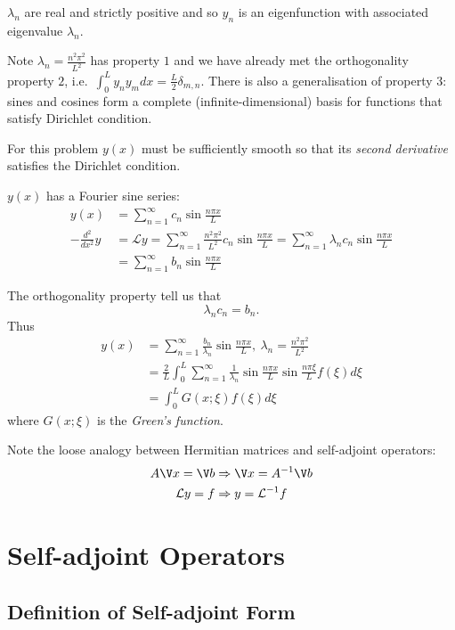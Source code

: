 \documentclass[a4paper]{article}
\renewcommand*{\L}{\mathcal{L}}
\begin{document}
\begin{note}
  \(\lambda_n\) are real and strictly positive and so \(y_n\) is an eigenfunction with associated eigenvalue \(\lambda_n\).
\end{note}

Note \(\lambda_n = \frac{n^2\pi^2}{L^2}\) has property \(1\) and we have already met the orthogonality property \(2\), i.e.\ \(\int_{0}^{L} y_ny_m dx=\frac{L}{2}\delta_{m,n} \). There is also a generalisation of property \(3\): sines and cosines form a complete (infinite-dimensional) basis for functions that satisfy Dirichlet condition.

For this problem \(y(x)\) must be sufficiently smooth so that its \emph{second derivative} satisfies the Dirichlet condition.

\(y(x)\) has a Fourier sine series:
\begin{align*}
  y(x) &= \sum_{n=1}^{\infty}c_n \sin \frac{n\pi x}{L} \\
  -\frac{d^2}{dx^2} y &= \L y = \sum_{n=1}^{\infty} \frac{n^2\pi^2}{L^2}c_n \sin \frac{n\pi x}{L} = \sum_{n=1}^{\infty} \lambda_n c_n \sin \frac{n\pi x}{L} \\
       &= \sum_{n=1}^{\infty}b_n \sin \frac{n\pi x}{L}
\end{align*}

The orthogonality property tell us that
\[
\lambda_n c_n = b_n.
\]
Thus
\begin{align*}
  y(x) &= \sum_{n=1}^{\infty} \frac{b_n}{\lambda_n} \sin \frac{n\pi x}{L}, \: \lambda_n = \frac{n^2\pi^2}{L^2} \\
       &= \frac{2}{L} \int_{0}^{L} \sum_{n=1}^{\infty} \frac{1}{\lambda_n} \sin \frac{n\pi x}{L}\sin\frac{n\pi\xi}{L} f(\xi) d\xi \\
        &= \int_{0}^{L} G(x; \xi) f(\xi) d\xi\end{align*}
where \(G(x;\xi)\) is the \emph{Green's function}.

Note the loose analogy between Hermitian matrices and self-adjoint operators:
\begin{align*}
  A\V x = \V b &\Rightarrow \V x = A^{-1}\V b \\
  \L y = f &\Rightarrow y = \L^{-1} f
\end{align*}

\section{Self-adjoint Operators}

\subsection{Definition of Self-adjoint Form}
\end{document}

